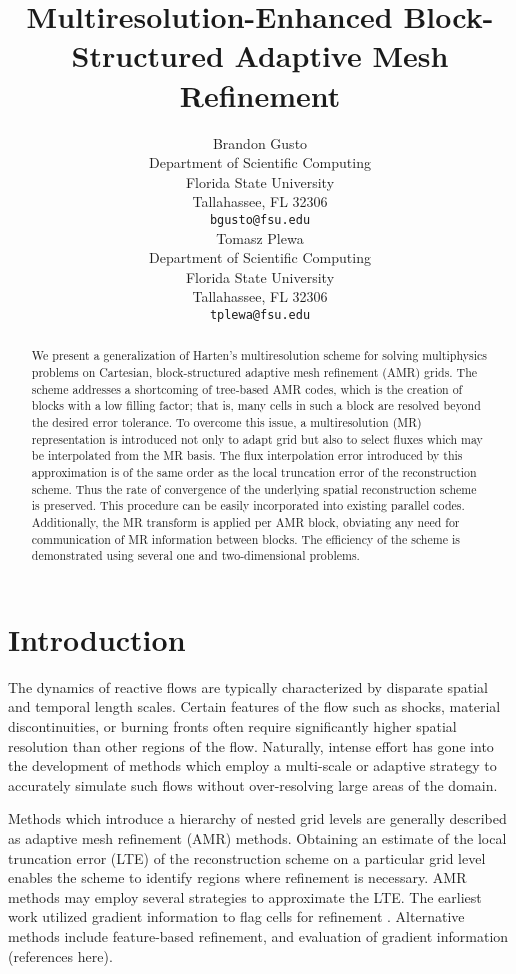 \documentclass{article}
\title{Multiresolution-Enhanced Block-Structured Adaptive Mesh Refinement}
\author{
  Brandon Gusto\\
  Department of Scientific Computing\\
  Florida State University\\
  Tallahassee, FL 32306 \\
  \texttt{bgusto@fsu.edu} \\
  \And
  Tomasz Plewa \\
  Department of Scientific Computing\\
  Florida State University\\
  Tallahassee, FL 32306 \\
  \texttt{tplewa@fsu.edu} \\
}
\begin{document}
\maketitle

\begin{abstract}
    We present a generalization of Harten's multiresolution scheme for solving
    multiphysics problems on Cartesian, block-structured adaptive mesh
    refinement (AMR) grids. The scheme addresses a shortcoming of tree-based AMR
    codes, which is the creation of blocks with a low filling factor; that is,
    many cells in such a block are resolved beyond the desired error tolerance.
    To overcome this issue, a multiresolution (MR) representation is introduced
    not only to adapt grid but also to select fluxes which may be interpolated
    from the MR basis.  The flux interpolation error introduced by this
    approximation is of the same order as the local truncation error of the
    reconstruction scheme. Thus the rate of convergence of the underlying
    spatial reconstruction scheme is preserved.  This procedure can be easily
    incorporated into existing parallel codes.  Additionally, the MR transform
    is applied per AMR block, obviating any need for communication of MR
    information between blocks. The efficiency of the scheme is demonstrated
    using several one and two-dimensional problems.
\end{abstract}


\section{Introduction}
    The dynamics of reactive flows are typically characterized by disparate
    spatial and temporal length scales. Certain features of the flow such as
    shocks, material discontinuities, or burning fronts often require
    significantly higher spatial resolution than other regions of the flow.
    Naturally, intense effort has gone into the development of methods which
    employ a multi-scale or adaptive strategy to accurately simulate such flows without
    over-resolving large areas of the domain.

    Methods which introduce a hierarchy of nested grid levels are generally
    described as adaptive mesh refinement (AMR) methods. Obtaining an estimate
    of the local truncation error (LTE) of the reconstruction scheme on a
    particular grid level enables the scheme to identify regions where
    refinement is necessary. AMR methods may employ several strategies to
    approximate the LTE. The earliest work utilized gradient information to flag
    cells for refinement \cite{Berger1984}.  Alternative methods include
    feature-based refinement, and evaluation of gradient information (references
    here).
\end{document}
